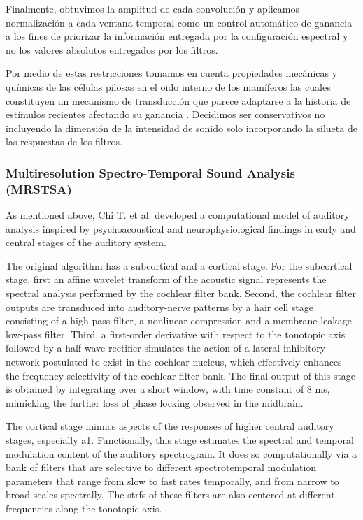 {Finalmente, obtuvimos la amplitud de cada convolución y aplicamos normalización a cada ventana temporal
como un control automático de ganancia a los fines de priorizar la información entregada por la
configuración espectral y no los valores absolutos entregados por los filtros.

Por medio de estas restricciones tomamos en cuenta propiedades mecánicas y químicas de las células pilosas en el oido interno de los mamíferos
las cuales constituyen un mecanismo de transducción que parece adaptarse a la historia de estímulos recientes afectando su ganancia
\cite{eatock_2000,holt_2000,le_goff_2005}. 
Decidimos ser conservativos no incluyendo la dimensión de la intensidad de sonido solo incorporando la silueta de las respuestas de los filtros.
}{
\subsubsection{Multiresolution Spectro-Temporal Sound Analysis (MRSTSA)}

As mentioned above, Chi T. et al. \cite{chi_2005} developed a computational model of auditory analysis inspired by psychoacoustical and
neurophysiological findings in early and central stages of the auditory system.

The original algorithm has a subcortical and a cortical stage.
For the subcortical stage, first an affine wavelet transform of the acoustic signal
represents the spectral analysis performed by the cochlear filter bank.
Second, the cochlear filter outputs are transduced into auditory-nerve
patterns by a hair cell stage consisting of a high-pass filter,
a nonlinear compression and a membrane leakage low-pass filter.
Third, a first-order derivative with respect to the tonotopic axis
followed by a half-wave rectifier
simulates the action of a lateral inhibitory
network postulated to exist in the cochlear nucleus,
which effectively enhances the frequency
selectivity of the cochlear filter bank.
The final output of this stage is obtained by integrating
over a short window, with time constant of 8 ms, mimicking
the further loss of phase locking observed
in the midbrain.

The cortical stage mimics aspects of the responses of higher
central auditory stages, especially \gls{a1}.
Functionally, this stage estimates the
spectral and temporal modulation content of the auditory
spectrogram. It does so computationally via a bank of filters
that are selective to different spectrotemporal modulation parameters
that range from slow to fast rates temporally, and
from narrow to broad scales spectrally. The \glspl{strf}
of these filters are also centered at
different frequencies along the tonotopic axis.

}
